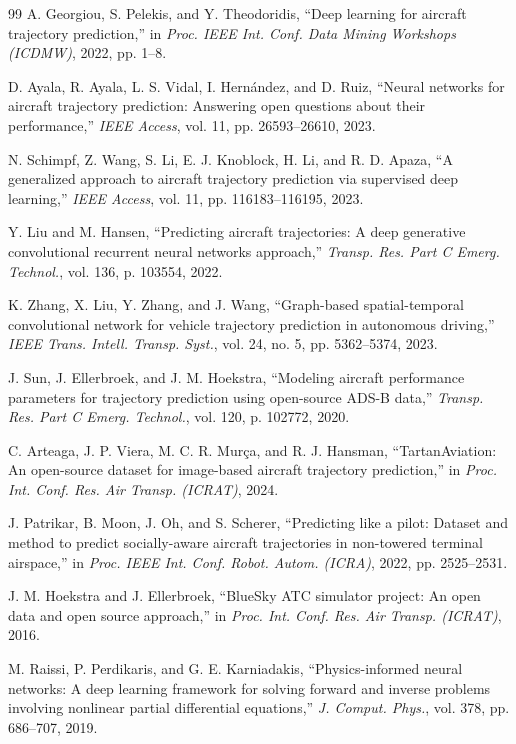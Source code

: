 \documentclass[letterpaper,journal]{IEEEtran}
\begin{document}
\begin{thebibliography}{99}
A. Georgiou, S. Pelekis, and Y. Theodoridis, ``Deep learning for aircraft trajectory prediction,'' in \textit{Proc. IEEE Int. Conf. Data Mining Workshops (ICDMW)}, 2022, pp. 1--8.

D. Ayala, R. Ayala, L. S. Vidal, I. Hern\'{a}ndez, and D. Ruiz, ``Neural networks for aircraft trajectory prediction: Answering open questions about their performance,'' \textit{IEEE Access}, vol. 11, pp. 26593--26610, 2023.

N. Schimpf, Z. Wang, S. Li, E. J. Knoblock, H. Li, and R. D. Apaza, ``A generalized approach to aircraft trajectory prediction via supervised deep learning,'' \textit{IEEE Access}, vol. 11, pp. 116183--116195, 2023.

Y. Liu and M. Hansen, ``Predicting aircraft trajectories: A deep generative convolutional recurrent neural networks approach,'' \textit{Transp. Res. Part C Emerg. Technol.}, vol. 136, p. 103554, 2022.

K. Zhang, X. Liu, Y. Zhang, and J. Wang, ``Graph-based spatial-temporal convolutional network for vehicle trajectory prediction in autonomous driving,'' \textit{IEEE Trans. Intell. Transp. Syst.}, vol. 24, no. 5, pp. 5362--5374, 2023.

J. Sun, J. Ellerbroek, and J. M. Hoekstra, ``Modeling aircraft performance parameters for trajectory prediction using open-source ADS-B data,'' \textit{Transp. Res. Part C Emerg. Technol.}, vol. 120, p. 102772, 2020.

C. Arteaga, J. P. Viera, M. C. R. Mur\c{c}a, and R. J. Hansman, ``TartanAviation: An open-source dataset for image-based aircraft trajectory prediction,'' in \textit{Proc. Int. Conf. Res. Air Transp. (ICRAT)}, 2024.

J. Patrikar, B. Moon, J. Oh, and S. Scherer, ``Predicting like a pilot: Dataset and method to predict socially-aware aircraft trajectories in non-towered terminal airspace,'' in \textit{Proc. IEEE Int. Conf. Robot. Autom. (ICRA)}, 2022, pp. 2525--2531.

J. M. Hoekstra and J. Ellerbroek, ``BlueSky ATC simulator project: An open data and open source approach,'' in \textit{Proc. Int. Conf. Res. Air Transp. (ICRAT)}, 2016.

M. Raissi, P. Perdikaris, and G. E. Karniadakis, ``Physics-informed neural networks: A deep learning framework for solving forward and inverse problems involving nonlinear partial differential equations,'' \textit{J. Comput. Phys.}, vol. 378, pp. 686--707, 2019.


\end{thebibliography}
\end{document}
